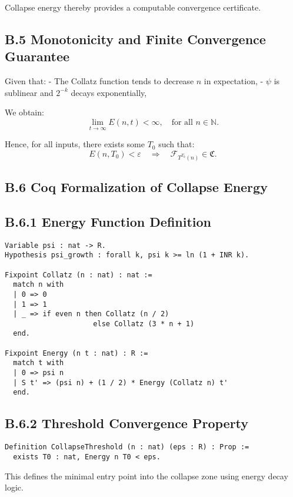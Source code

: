 \documentclass[11pt]{article}
\begin{document}
Collapse energy thereby provides a computable convergence certificate.

\subsection*{B.5 Monotonicity and Finite Convergence Guarantee}

Given that:
- The Collatz function tends to decrease \( n \) in expectation,
- \( \psi \) is sublinear and \( 2^{-k} \) decays exponentially,

We obtain:
\[
\lim_{t \to \infty} E(n, t) < \infty, \quad \text{for all } n \in \mathbb{N}.
\]

Hence, for all inputs, there exists some \( T_0 \) such that:
\[
E(n, T_0) < \varepsilon \quad \Rightarrow \quad \mathcal{F}_{T^{T_0}(n)} \in \mathfrak{C}.
\]

\subsection*{B.6 Coq Formalization of Collapse Energy}

\subsection*{B.6.1 Energy Function Definition}

\begin{lstlisting}[language=Coq]
Variable psi : nat -> R.
Hypothesis psi_growth : forall k, psi k >= ln (1 + INR k).

Fixpoint Collatz (n : nat) : nat :=
  match n with
  | 0 => 0
  | 1 => 1
  | _ => if even n then Collatz (n / 2)
                     else Collatz (3 * n + 1)
  end.

Fixpoint Energy (n t : nat) : R :=
  match t with
  | 0 => psi n
  | S t' => (psi n) + (1 / 2) * Energy (Collatz n) t'
  end.
\end{lstlisting}

\subsection*{B.6.2 Threshold Convergence Property}

\begin{lstlisting}[language=Coq]
Definition CollapseThreshold (n : nat) (eps : R) : Prop :=
  exists T0 : nat, Energy n T0 < eps.
\end{lstlisting}

\noindent This defines the minimal entry point into the collapse zone using energy decay logic.
\end{document}
